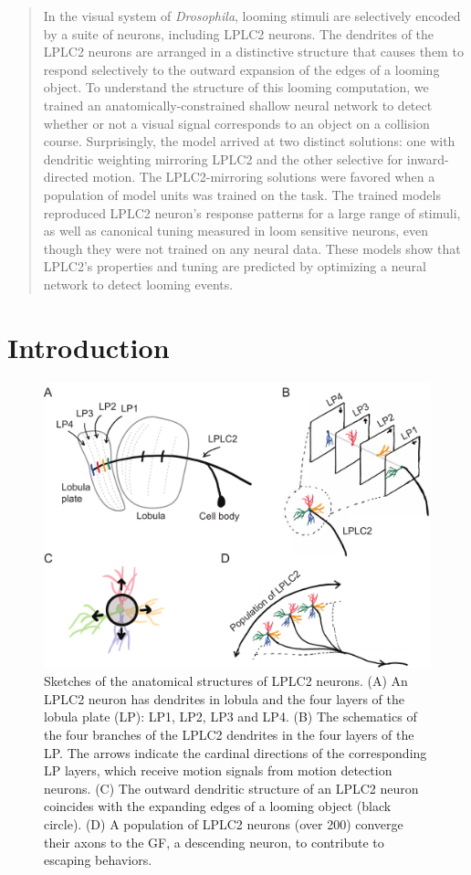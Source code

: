 \documentclass[pdftex,9pt,lineno]{elife}
\begin{document}
\begin{abstract}
In the visual system of \textit{Drosophila}, looming stimuli are selectively encoded by a suite of neurons, including LPLC2 neurons. The dendrites of the LPLC2 neurons are arranged in a distinctive structure that causes them to respond selectively to the outward expansion of the edges of a looming object. To understand the structure of this looming computation, we trained an anatomically-constrained shallow neural network to detect whether or not a visual signal corresponds to an object on a collision course. Surprisingly, the model arrived at two distinct solutions: one with dendritic weighting mirroring LPLC2 and the other selective for inward-directed motion. The LPLC2-mirroring solutions were favored when a population of model units was trained on the task. The trained models reproduced LPLC2 neuron’s response patterns for a large range of stimuli, as well as canonical tuning measured in loom sensitive neurons, even though they were not trained on any neural data. These models show that LPLC2's properties and tuning are predicted by optimizing a neural network to detect looming events.
\end{abstract}


\section{Introduction}

\begin{figure}
\includegraphics[width=\linewidth]{figures/anatomy_paper.pdf}
\caption{Sketches of the anatomical structures of LPLC2 neurons. (A) An LPLC2 neuron has dendrites in lobula and the four layers of the lobula plate (LP): LP1, LP2, LP3 and LP4. (B) The schematics of the four branches of the LPLC2 dendrites in the four layers of the LP. The arrows indicate the cardinal directions of the corresponding LP layers, which receive motion signals from motion detection neurons. (C) The outward dendritic structure of an LPLC2 neuron coincides with the expanding edges of a looming object (black circle). (D) A population of LPLC2 neurons (over 200) converge their axons to the GF, a descending neuron, to contribute to escaping behaviors.}
\label{fig:anatomy}
\end{figure}
\end{document}
